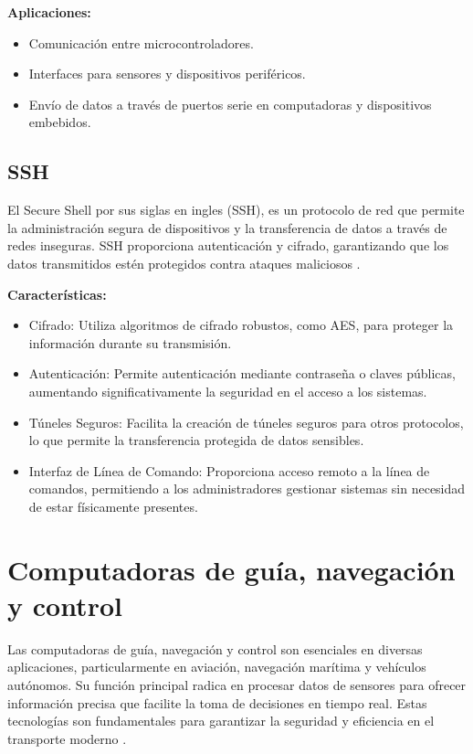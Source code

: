 \textbf{Aplicaciones:}

\begin{itemize}
    \item Comunicación entre microcontroladores.
    \item Interfaces para sensores y dispositivos periféricos.
    \item Envío de datos a través de puertos serie en computadoras y dispositivos embebidos.
\end{itemize}

\subsection{SSH}

El Secure Shell por sus siglas en ingles (SSH), es un protocolo de red que permite la administración segura de dispositivos y la transferencia de datos a través de redes inseguras. SSH proporciona autenticación y cifrado, garantizando que los datos transmitidos estén protegidos contra ataques maliciosos \cite{coca2023interfaz}.

\textbf{Características:}

\begin{itemize}
    \item Cifrado: Utiliza algoritmos de cifrado robustos, como AES, para proteger la información durante su transmisión.
    \item Autenticación: Permite autenticación mediante contraseña o claves públicas, aumentando significativamente la seguridad en el acceso a los sistemas.
    \item Túneles Seguros: Facilita la creación de túneles seguros para otros protocolos, lo que permite la transferencia protegida de datos sensibles.
    \item Interfaz de Línea de Comando: Proporciona acceso remoto a la línea de comandos, permitiendo a los administradores gestionar sistemas sin necesidad de estar físicamente presentes.
\end{itemize}

\section{Computadoras de guía, navegación y control}

Las computadoras de guía, navegación y control son esenciales en diversas aplicaciones, particularmente en aviación, navegación marítima y vehículos autónomos. Su función principal radica en procesar datos de sensores para ofrecer información precisa que facilite la toma de decisiones en tiempo real. Estas tecnologías son fundamentales para garantizar la seguridad y eficiencia en el transporte moderno \cite{pellacani2019design}.

